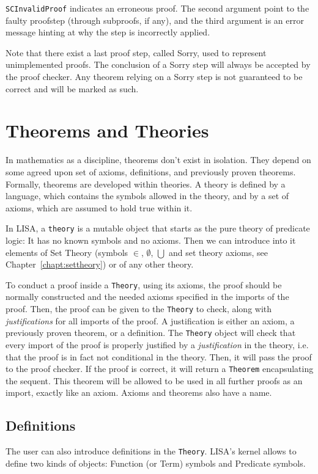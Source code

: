 \lstinline{SCInvalidProof}{} indicates an erroneous proof. The second argument point to the faulty proofstep (through subproofs, if any), and the third argument is an error message hinting at why the step is incorrectly applied.

Note that there exist a last proof step, called Sorry, used to  represent unimplemented proofs. The conclusion of a Sorry step will always be accepted by the proof checker. Any theorem relying on a Sorry step is not guaranteed to be correct and will be marked as such.


\section{Theorems and Theories}
\label{sect:TheoremsAndTheories}

In mathematics as a discipline, theorems don't exist in isolation. They depend on some agreed upon set of axioms, definitions, and previously proven theorems. Formally, theorems are developed within theories. A theory is defined by a language, which contains the symbols allowed in the theory, and by a set of axioms, which are assumed to hold true within it.

In LISA, a \lstinline{theory}{} is a mutable object that starts as the pure theory of predicate logic: It has no known symbols and no axioms. Then we can introduce into it elements of Set Theory (symbols $\in$, $\emptyset$, $\bigcup$ and set theory axioms, see Chapter~\ref{chapt:settheory}) or of any other theory.

To conduct a proof inside a \lstinline{Theory}{}, using its axioms, the proof should be normally constructed and the needed axioms specified in the imports of the proof. Then, the proof can be given to the \lstinline{Theory}{} to check, along with \textit{justifications} for all imports of the proof. A justification is either an axiom, a previously proven theorem, or a definition. The \lstinline{Theory}{} object will check that every import of the proof is properly justified by a \textit{justification} in the theory, i.e. that the proof is in fact not conditional in the theory. Then, it will pass the proof to the proof checker. If the proof is correct, it will return a \lstinline{Theorem}{} encapsulating the sequent. This theorem will be allowed to be used in all further proofs as an import, exactly like an axiom. Axioms and theorems also have a name.

\subsection{Definitions}
\label{subsec:definitions}
The user can also introduce definitions in the \lstinline{Theory}{}.
LISA's kernel allows to define two kinds of objects: Function (or Term) symbols and Predicate symbols. 


